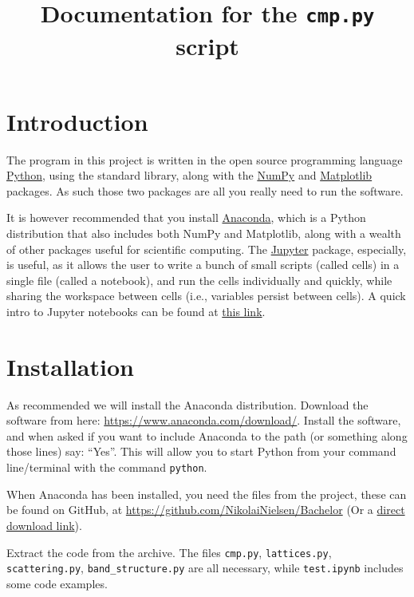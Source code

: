 \documentclass[a4paper,11pt]{article}
\title{Documentation for the \texorpdfstring{\texttt{cmp.py}}{cmp.py} script}
\date{}
\numberwithin{equation}{section}
\begin{document}
	\maketitle
	
	\section{Introduction}
	The program in this project is written in the open source programming language \href{www.python.org}{Python}, using the standard library, along with the \href{www.numpy.org}{NumPy} and \href{www.matplotlib.org}{Matplotlib} packages. As such those two packages are all you really need to run the software.
	
	It is however recommended that you install \href{https://www.anaconda.com/}{Anaconda}, which is a Python distribution that also includes both NumPy and Matplotlib, along with a wealth of other packages useful for scientific computing. The \href{http://jupyter.org/}{Jupyter} package, especially, is useful, as it allows the user to write a bunch of small scripts (called cells) in a single file (called a notebook), and run the cells individually and quickly, while sharing the workspace between cells (i.e., variables persist between cells). A quick intro to Jupyter notebooks can be found at \href{http://nbviewer.jupyter.org/github/jupyter/notebook/blob/master/docs/source/examples/Notebook/Notebook Basics.ipynb}{this link}.
	
	\section{Installation}
	As recommended we will install the Anaconda distribution. Download the software from here: \url{https://www.anaconda.com/download/}. Install the software, and when asked if you want to include Anaconda to the path (or something along those lines) say: ``Yes''. This will allow you to start Python from your command line/terminal with the command \texttt{python}.
	
	When Anaconda has been installed, you need the files from the project, these can be found on GitHub, at \url{https://github.com/NikolaiNielsen/Bachelor} (Or a \href{https://github.com/NikolaiNielsen/Bachelor/archive/master.zip}{direct download link}).
	
	Extract the code from the archive. The files \texttt{cmp.py}, \texttt{lattices.py}, \texttt{scattering.py}, \texttt{band\_structure.py} are all necessary, while \texttt{test.ipynb} includes some code examples.
	
\end{document}
